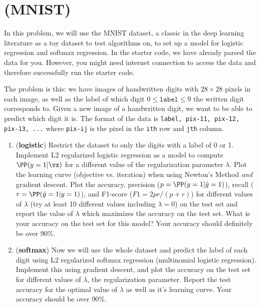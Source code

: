 \documentclass[189]{pset}
\begin{document}
  \section{(MNIST)}
    In this problem, we will use the MNIST dataset, a classic in the
    deep learning literature as a toy dataset to test algorithms on,
    to set up a model for logistic regression and softmax regression.
    In the starter code, we have already parsed the data for you.
    However, you might need internet connection to access the data and
    therefore successfully run the starter code.

    The problem is this: we have images of handwritten digits with
    $28\times 28$ pixels in each image, as well as the label of which
    digit $0 \leq \texttt{label} \leq 9$ the written digit corresponds
    to. Given a new image of a handwritten digit, we want to be able
    to predict which digit it is. The format of the data is
    \texttt{label, pix-11, pix-12, pix-13, ...} where \texttt{pix-ij}
    is the pixel in the \texttt{ith} row and \texttt{jth} column.

    \begin{enumerate}
      \item (\textbf{logistic}) Restrict the dataset to only the
        digits with a label of 0 or 1. Implement L2 regularized
        logistic regression as a model to compute $\PP(y=1|\vx)$ for a
        different value of the regularization parameter $\lambda$.
        Plot the learning curve (objective vs. iteration) when using
        Newton's Method \textit{and} gradient descent. Plot the
        accuracy, precision ($p = \PP(y=1 | \hat y=1)$), recall ($r =
        \PP(\hat y=1 | y=1)$), and F1-score ($F1 = 2pr / (p+r)$) for
        different values of $\lambda$ (try at least 10 different
        values including $\lambda = 0$) on the test set and report the
        value of $\lambda$ which maximizes the accuracy on the test
        set. What is your accuracy on the test set for this model?
        Your accuracy should definitely be over 90\%.
      \item (\textbf{softmax}) Now we will use the whole dataset and
        predict the label of each digit using L2 regularized softmax
        regression (multinomial logistic regression). Implement this
        using gradient descent, and plot the accuracy on the test set
        for different values of $\lambda$, the regularization
        parameter. Report the test accuracy for the optimal value of
        $\lambda$ as well as it's learning curve. Your accuracy should
        be over 90\%.
    \end{enumerate}
\end{document}
